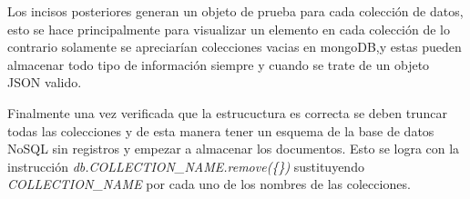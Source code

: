 Los incisos posteriores generan un objeto de prueba para cada colección de datos, esto se hace principalmente para visualizar un elemento en cada colección de lo contrario solamente se apreciarían colecciones vacias en mongoDB,y estas  pueden almacenar todo tipo de información siempre y cuando se trate de un objeto JSON valido.


Finalmente una vez verificada que la estrucuctura es correcta se deben truncar todas las colecciones y de esta manera tener un esquema de la base de datos NoSQL sin registros y empezar a almacenar los documentos. Esto se logra con la instrucción \textit{db.COLLECTION\_NAME.remove(\{\})} sustituyendo  \textit{COLLECTION\_NAME} por cada uno de los nombres de las colecciones.
